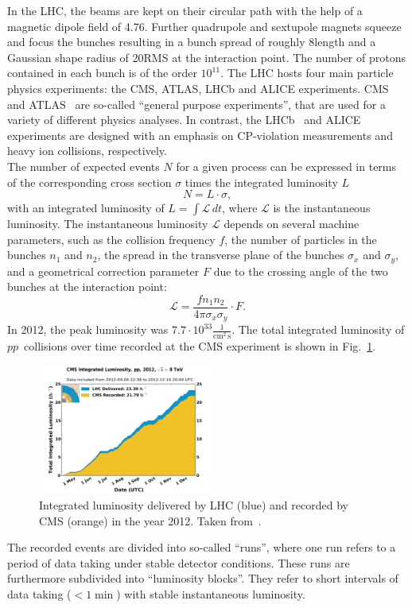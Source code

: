 In the LHC, the beams are kept on their circular path with the help of a magnetic dipole field of 4.76\tesla.
Further quadrupole and sextupole magnets squeeze and focus the bunches resulting in a bunch spread of roughly 8\cm length and a Gaussian shape radius of 20\mum RMS at the interaction point.
The number of protons contained in each bunch is of the order $10^{11}$.
The LHC hosts four main particle physics experiments: the CMS, ATLAS, LHCb and ALICE experiments.
CMS~\cite{bib:CMS:experiment,bib:CMS:TDR} and ATLAS~\cite{bib:ATLAS:experiment,bib:ATLAS:TDR_1,bib:ATLAS:TDR_2} are so-called ``general purpose experiments'', that are used for a variety of different physics analyses.
In contrast, the LHCb~\cite{bib:LHCb:experiment} and ALICE~\cite{bib:ALICE:experiment} experiments are designed with an emphasis on CP-violation measurements and heavy ion collisions, respectively.\\

The number of expected events $N$ for a given process can be expressed in terms of the corresponding cross section $\sigma$ times the integrated luminosity $L$
\begin{equation}
N = L \cdot \sigma,
\end{equation}
with an integrated luminosity of $L=\int \mathcal{L}\, dt$, where $\mathcal{L}$ is the instantaneous luminosity.
The instantaneous luminosity $\mathcal{L}$ depends on several machine parameters, such as the collision frequency $f$, the number of particles in the bunches $n_1$ and $n_2$,
the spread in the transverse plane of the bunches $\sigma_x$ and $\sigma_y$, and a geometrical correction parameter $F$ due to the crossing angle of the two bunches at the interaction point:
\begin{equation}
\mathcal{L} = \frac{f n_1 n_2 }{4 \pi \sigma_x \sigma_y} \cdot F.
\end{equation}
In 2012, the peak luminosity was $7.7 \cdot 10^{33} \frac{1}{\text{cm}^2\,\text{s}}$.
The total integrated luminosity of $pp$~collisions over time recorded at the CMS experiment is shown in Fig.~\ref{fig:Lumi}.
\begin{figure}[!b]
  \centering
      \includegraphics[width=0.51\textwidth]{figures/experiment/LHC/int_lumi_per_day_cumulative_pp_2012.pdf}
  \caption{Integrated luminosity delivered by LHC (blue) and recorded by CMS (orange) in the year 2012. Taken from~\cite{bib:LumiWiki}.}  
  \label{fig:Lumi}
\end{figure}
The recorded events are divided into so-called ``runs'', where one run refers to a period of data taking under stable detector conditions.
These runs are furthermore subdivided into ``luminosity blocks''.
They refer to short intervals of data taking ($<1\min$) with stable instantaneous luminosity.

